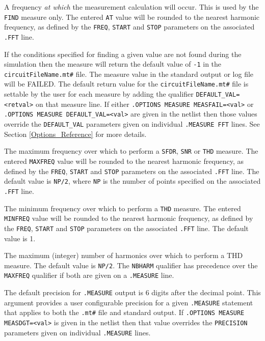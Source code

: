 \begin{Command}
\begin{Arguments}
A frequency {\em at which} the measurement calculation will occur.  This is
used by the {\tt FIND} measure only.  The entered {\tt AT} value will be
rounded to the nearest harmonic frequency, as defined by the {\tt FREQ},
{\tt START} and {\tt STOP} parameters on the associated {\tt .FFT} line.


If the conditions specified for finding a given value are not found
during the simulation then the measure will return the default value
of {\tt -1} in the \texttt{circuitFileName.mt\#} file.
The measure value in the standard output or log file will be
FAILED.  The default return value for the \texttt{circuitFileName.mt\#}
file is settable by the user for each measure by adding the qualifier
{\tt DEFAULT\_VAL=<retval>} on that measure line.  If either
\texttt{.OPTIONS MEASURE MEASFAIL=<val>} or
\texttt{.OPTIONS MEASURE DEFAULT\_VAL=<val>} are given in the
netlist then those values override the \texttt{DEFAULT\_VAL}
parameters given on individual \texttt{.MEASURE FFT} lines.
See Section \ref{Options_Reference} for more details.

The maximum frequency over which to perform a {\tt SFDR}, {\tt SNR}
or {\tt THD} measure. The entered {\tt MAXFREQ} value will be rounded
to the nearest harmonic frequency, as defined by the {\tt FREQ},
{\tt START} and {\tt STOP} parameters on the associated {\tt .FFT}
line.  The default value is {\tt NP/2}, where {\tt NP} is the number
of points specified on the associated {\tt .FFT} line.

The minimum frequency over which to perform a {\tt THD} measure.
The entered {\tt MINFREQ} value will be rounded to the nearest harmonic
frequency, as defined by the {\tt FREQ}, {\tt START} and {\tt STOP}
parameters on the associated {\tt .FFT} line.  The default value is 1.

The maximum (integer) number of harmonics over which to perform a THD measure.
The default value is {\tt NP/2}.  The {\tt NBHARM} qualifier has precedence
over the {\tt MAXFREQ} qualifier if both are given on a {\tt .MEASURE} line.


The default precision for {\tt .MEASURE} output is 6 digits after the
decimal point.  This argument provides a user configurable precision
for a given {\tt .MEASURE} statement that applies to both the
\texttt{.mt\#} file and standard output.
If \texttt{.OPTIONS MEASURE MEASDGT=<val>} is given in the netlist
then that value overrides the \texttt{PRECISION} parameters given on
individual \texttt{.MEASURE} lines.


\end{Arguments}
\end{Command}

